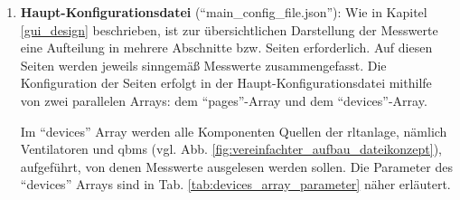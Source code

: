 \begin{enumerate}
	\item \textbf{Haupt-Konfigurationsdatei} (\enquote{main\_config\_file.json}):
	Wie in Kapitel \ref{gui_design} beschrieben, ist zur übersichtlichen Darstellung der Messwerte eine Aufteilung in mehrere Abschnitte bzw. Seiten erforderlich. Auf diesen Seiten werden jeweils sinngemäß Messwerte zusammengefasst. Die Konfiguration der Seiten erfolgt in der Haupt-Konfigurationsdatei mithilfe von zwei parallelen Arrays: dem \enquote{pages}-Array und dem \enquote{devices}-Array. 	
	
	Im \enquote{devices} Array werden alle Komponenten \bzw Quellen der \acs{rltanlage}, nämlich Ventilatoren und \gls{qbm}s (vgl. Abb. \ref{fig:vereinfachter_aufbau_dateikonzept}), aufgeführt, von denen Messwerte ausgelesen werden sollen. Die Parameter des \enquote{devices} Arrays sind in Tab. \ref{tab:devices_array_parameter} näher erläutert.


\end{enumerate}

